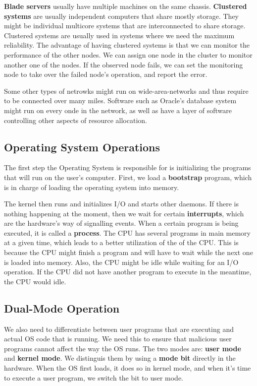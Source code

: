\documentclass{tufte-handout}
\begin{document}
\textbf{Blade servers} usually have multiple machines on the same chassis. 
\textbf{Clustered systems} are usually independent computers that share mostly storage.
They might be individual multicore systems that are interconnected to share storage.
Clustered systems are usually used in systems where we need the maximum reliability.
The advantage of having clustered systems is that we can monitor the performance of the
other nodes. We can assign one node in the cluster to monitor another one of the nodes.
If the observed node fails, we can set the monitoring node to take over the failed node's
operation, and report the error.

Some other types of netrowks might run on wide-area-networks and thus require to be 
connected over many miles. Software such as Oracle's database system might run on every 
onde in the network, as well as have a layer of software controlling other aspects of
resource allocation.

\subsection{Operating System Operations}
The first step the Operating System is responsible for is initializing the programs
that will run on the user's computer.
First, we load a \textbf{bootstrap} program, which is in charge of loading the operating
system into memory.

The kernel then runs and initializes I/O and starts other daemons. 
If there is nothing happening at the moment, then we wait 
for certain \textbf{interrupts}, which are the hardware's way of signalling events.
When a certain program is being executed, it is called a \textbf{process}. The CPU
has several programs in main memory at a given time, which leads to a better utilization
of the of the CPU. 
This is because the CPU might finish a program and will have to wait while the next 
one is loaded into memory. Also, the CPU might be idle while waiting for an I/O operation.
If the CPU did not have another program to execute in the meantime, the CPU would idle.

\subsection{Dual-Mode Operation}
We also need to differentiate between user programs that are executing and actual 
OS code that is running. We need this to ensure that malicious user programs cannot
affect the way the OS runs. The two modes are: \textbf{user mode} and \textbf{kernel mode}.
We distinguis them by using a \textbf{mode bit} directly in the hardware. When the OS 
first loads, it does so in kernel mode, and when it's time to execute a user program,
we switch the bit to user mode.
\end{document}
